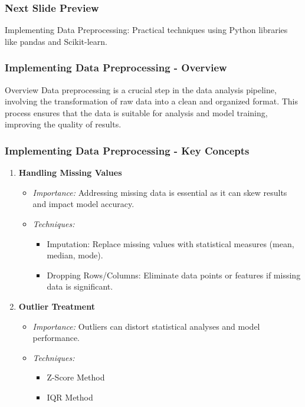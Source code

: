 \documentclass[aspectratio=169]{beamer}
\begin{document}
\begin{frame}
    \frametitle{Next Slide Preview}
    Implementing Data Preprocessing: Practical techniques using Python libraries like pandas and Scikit-learn.
\end{frame}

\begin{frame}
    \frametitle{Implementing Data Preprocessing - Overview}
    \begin{block}{Overview}
        Data preprocessing is a crucial step in the data analysis pipeline, involving the transformation of raw data into a clean and organized format. 
        This process ensures that the data is suitable for analysis and model training, improving the quality of results.
    \end{block}
\end{frame}

\begin{frame}
    \frametitle{Implementing Data Preprocessing - Key Concepts}
    \begin{enumerate}
        \item \textbf{Handling Missing Values}
        \begin{itemize}
            \item \textit{Importance:} Addressing missing data is essential as it can skew results and impact model accuracy.
            \item \textit{Techniques:}
            \begin{itemize}
                \item Imputation: Replace missing values with statistical measures (mean, median, mode).
                \item Dropping Rows/Columns: Eliminate data points or features if missing data is significant.
            \end{itemize}
        \end{itemize}

        \item \textbf{Outlier Treatment}
        \begin{itemize}
            \item \textit{Importance:} Outliers can distort statistical analyses and model performance.
            \item \textit{Techniques:}
            \begin{itemize}
                \item Z-Score Method
                \item IQR Method
            \end{itemize}
        \end{itemize}
    \end{enumerate}
\end{frame}
\end{document}
